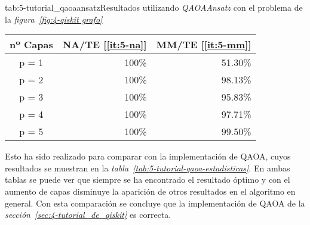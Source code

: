 \begin{table}[htbp]{tab:5-tutorial_qaoaansatz}{Resultados utilizando \textit{QAOAAnsatz} con el problema de la \textit{figura~\ref{fig:4-qiskit grafo}}}
  \begin{tabular}{|c|r|r|}
    \hline
    \textbf{nº Capas} & \textbf{NA/TE} [\ref{it:5-na}] & \textbf{MM/TE} [\ref{it:5-mm}] \\ \hline
    p = 1 & 100\% & 51.30\% \\ \hline
    p = 2 & 100\% & 98.13\% \\ \hline
    p = 3 & 100\% & 95.83\% \\ \hline
    p = 4 & 100\% & 97.71\% \\ \hline
    p = 5 & 100\% & 99.50\% \\ \hline
  \end{tabular}
\end{table}

Esto ha sido realizado para comparar con la implementación de QAOA, cuyos resultados se muestran en la \textit{tabla~\ref{tab:5-tutorial-qaoa-estadisticas}}. En ambas tablas se puede ver que siempre se ha encontrado el resultado óptimo y con el aumento de capas disminuye la aparición de otros resultados en el algoritmo en general. Con esta comparación se concluye que la implementación de QAOA de la \textit{sección~\ref{sec:4-tutorial_de_qiskit}} es correcta.


